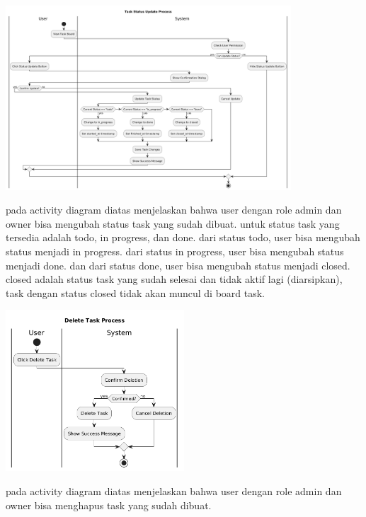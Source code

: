\begin{center}
    \includegraphics[width=0.8\textwidth]{assets/activity_diagrams/task_status_update.png}
\end{center}
pada activity diagram diatas menjelaskan bahwa user dengan role admin dan owner bisa mengubah status task yang sudah dibuat.
untuk status task yang tersedia adalah todo, in progress, dan done. dari status todo, user bisa mengubah status menjadi in progress.
dari status in progress, user bisa mengubah status menjadi done. dan dari status done, user bisa mengubah status menjadi closed. 
closed adalah status task yang sudah selesai dan tidak aktif lagi (diarsipkan), task dengan status closed tidak akan muncul di board task.

\begin{center}
    \includegraphics[width=0.5\textwidth]{assets/activity_diagrams/task_delete.png}
\end{center}
pada activity diagram diatas menjelaskan bahwa user dengan role admin dan owner bisa menghapus task yang sudah dibuat.

